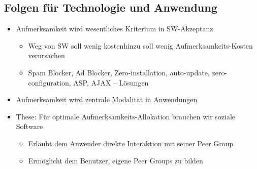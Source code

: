\documentclass{article} %
\begin{document}
	\subsection{Folgen für Technologie und Anwendung}
	\begin{itemize}
		\item Aufmerksamkeit wird wesentliches Kriterium in SW-Akzeptanz
		\begin{itemize}
			\item Weg von \glqq SW soll wenig kosten\grqq hinzu \glqq soll wenig Aufmerksamkeits-Kosten verursachen\grqq
			\item Spam Blocker, Ad Blocker, Zero-installation, auto-update, zero-configuration, ASP, AJAX – Lösungen
		\end{itemize}
		\item Aufmerksamkeit wird zentrale Modalität in Anwendungen
		\item These: Für optimale Aufmerksamkeits-Allokation brauchen wir soziale Software
		\begin{itemize}
			\item Erlaubt dem Anwender direkte Interaktion mit seiner Peer Group
			\item Ermöglicht dem Benutzer, eigene Peer Groups zu bilden
		\end{itemize}
	\end{itemize}
\end{document}
